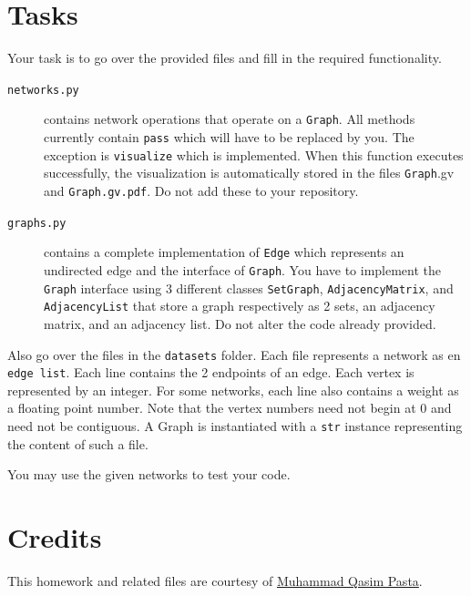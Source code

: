 \documentclass[addpoints]{exam}
\begin{document}
\section{Tasks}

Your task is to go over the provided files and fill in the required functionality.
\begin{description}
\item[\texttt{networks.py}] contains network operations that operate on a \texttt{Graph}. All methods currently contain \texttt{pass} which will have to be replaced by you. The exception is \texttt{visualize} which is implemented. When this function executes successfully, the visualization is automatically stored in the files \texttt{Graph}.gv and \texttt{Graph.gv.pdf}. Do not add these to your repository.
\item[\texttt{graphs.py}] contains a complete implementation of \texttt{Edge} which represents an undirected edge and the interface of \texttt{Graph}. You have to implement the \texttt{Graph} interface using 3 different classes \texttt{SetGraph}, \texttt{AdjacencyMatrix}, and \texttt{AdjacencyList} that store a graph respectively as 2 sets, an adjacency matrix, and an adjacency list. Do not alter the code already provided.
\end{description}

Also go over the files in the \texttt{datasets} folder. Each file represents a network as en \texttt{edge list}. Each line contains the 2 endpoints of an edge. Each vertex is represented by an integer. For some networks, each line also contains a weight as a floating point number. Note that the vertex numbers need not begin at 0 and need not be contiguous. A Graph is instantiated with a \texttt{str} instance representing the content of such a file.

You may use the given networks to test your code. 

\section*{Credits}

This homework and related files are courtesy of \href{http://qasimpasta.info}{Muhammad Qasim Pasta}.
\end{document}
